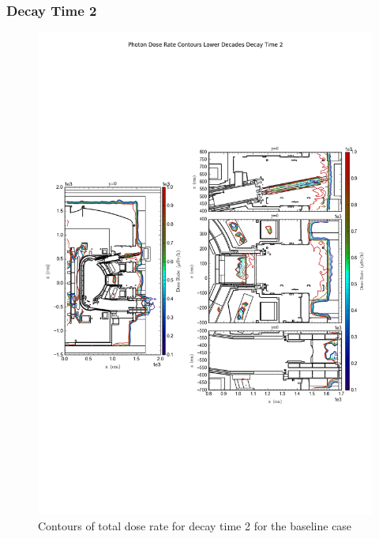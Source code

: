 \documentclass[12pt]{article}
\begin{document}
\subsubsection*{Decay Time 2}
\begin{figure}[ht!]
\centering
\includegraphics[trim={0cm 8cm, 0cm 8cm},clip,scale=0.75]{../plots/final_model/Photon_Dose_Rate_Contours_Lower_Decades_Decay_Time_2.png}
\caption{Contours of total dose rate for decay time 2 for the baseline case}
\label{fig:photons_dc2_nob4c_contours_l}
\end{figure}
\end{document}

